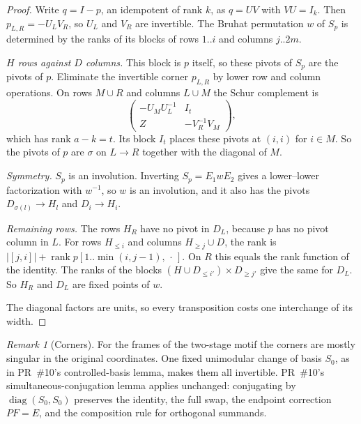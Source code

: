 \documentclass[11pt]{article}
\theoremstyle{remark}\newtheorem*{remark}{Remark}
\begin{document}
\begin{proof}
Write $q=I-p$, an idempotent of rank $k$, as $q=UV$ with $VU=I_k$. Then $p_{L,R}=-U_LV_R$, so $U_L$ and $V_R$
are invertible. The Bruhat permutation $w$ of $S_p$ is determined by the ranks of its blocks of rows
$1..i$ and columns $j..2m$.

\emph{$H$ rows against $D$ columns.} This block is $p$ itself, so these pivots of $S_p$ are the pivots of $p$.
Eliminate the invertible corner $p_{L,R}$ by lower row and column operations. On rows $M\cup R$ and
columns $L\cup M$ the Schur complement is
\[
 \begin{pmatrix}-U_MU_L^{-1}&I_t\\ Z&-V_R^{-1}V_M\end{pmatrix},
\]
which has rank $a-k=t$. Its block $I_t$ places these pivots at $(i,i)$ for $i\in M$. So the pivots of $p$
are $\sigma$ on $L\to R$ together with the diagonal of $M$.

\emph{Symmetry.} $S_p$ is an involution. Inverting $S_p=E_1wE_2$ gives a lower--lower factorization with $w^{-1}$,
so $w$ is an involution, and it also has the pivots $D_{\sigma(l)}\to H_l$ and $D_i\to H_i$.

\emph{Remaining rows.} The rows $H_R$ have no pivot in $D_L$, because $p$ has no pivot column in $L$.
For rows $H_{\le i}$ and columns $H_{\ge j}\cup D$, the rank is $|[j,i]|+\operatorname{rank}p[1..\min(i,j-1),\,\cdot\,]$.
On $R$ this equals the rank function of the identity. The ranks of the blocks
$(H\cup D_{\le i'})\times D_{\ge j'}$ give the same for $D_L$. So $H_R$ and $D_L$ are fixed points of $w$.

The diagonal factors are units, so every transposition costs one interchange of its width.
\end{proof}

\begin{remark}[Corners]
For the frames of the two-stage motif the corners are mostly singular in the original coordinates.
One fixed unimodular change of basis $S_0$, as in PR~\#10's controlled-basis lemma, makes them all invertible.
PR~\#10's simultaneous-conjugation lemma applies unchanged: conjugating by $\operatorname{diag}(S_0,S_0)$ preserves
the identity, the full swap, the endpoint correction $PF=E$, and the composition rule for orthogonal summands.
\end{remark}
\end{document}
